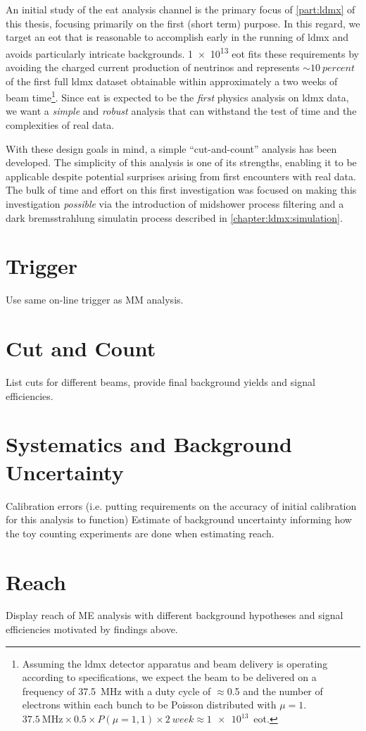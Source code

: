 An initial study of the \ac{eat} analysis channel is the primary focus of \cref{part:ldmx} of this
thesis, focusing primarily on the first (short term) purpose. In this regard, we target an \ac{eot}
that is reasonable to accomplish early in the running of \ac{ldmx} and avoids particularly
intricate backgrounds. \num{1e13} \ac{eot} fits these requirements by avoiding the charged current
production of neutrinos and represents $\sim\qty{10}{percent}$ of the first full \ac{ldmx} dataset
obtainable within approximately a two weeks of beam time\footnote{ Assuming the \ac{ldmx} detector
  apparatus and beam delivery is operating according to specifications, we expect the beam to be
  delivered on a frequency of \qty{37.5}{\mega\hertz} with a duty cycle of $\approx$\num{0.5} and the
  number of electrons within each bunch to be Poisson distributed with $\mu=1$.
  $\qty{37.5}{\mega\hertz}\times0.5\times P(\mu=1,1) \times\qty{2}{week}\approx\num{1e13}$~\ac{eot}.
}. Since \ac{eat} is expected to be the \emph{first} physics analysis on \ac{ldmx} data, we want a
\emph{simple} and \emph{robust} analysis that can withstand the test of time and the complexities
of real data.

With these design goals in mind, a simple ``cut-and-count'' analysis has been developed. The
simplicity of this analysis is one of its strengths, enabling it to be applicable despite potential
surprises arising from first encounters with real data. The bulk of time and effort on this first
investigation was focused on making this investigation \emph{possible} via the introduction of
midshower process filtering and a dark bremsstrahlung simulatin process described in
\cref{chapter:ldmx:simulation}.

\section{Trigger}
Use same on-line trigger as MM analysis.

\section{Cut and Count}
List cuts for different beams, provide final background yields and signal efficiencies.

\section{Systematics and Background Uncertainty}
Calibration errors (i.e. putting requirements on the accuracy of initial calibration for this
analysis to function) Estimate of background uncertainty informing how the toy counting experiments
are done when estimating reach.

\section{Reach}
Display reach of ME analysis with different background hypotheses and signal efficiencies motivated
by findings above.

